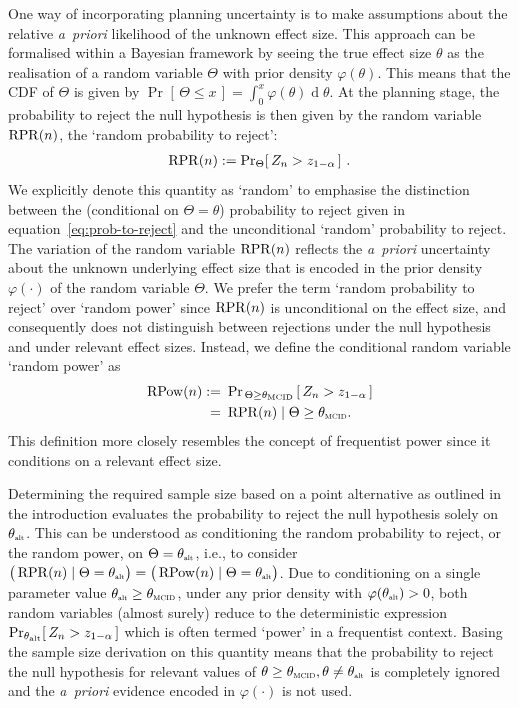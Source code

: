 \documentclass{article}
\renewcommand{\Pr}{\operatorname{Pr}}
\begin{document}
One way of incorporating planning uncertainty is to make assumptions about the relative \textit{a~priori} likelihood of the unknown effect size.
This approach can be formalised within a Bayesian framework by seeing the true effect size $\theta$ as the realisation of a random
variable $\Theta$ with prior density $\varphi(\theta)$.
This means that the CDF of
$\Theta$ is given by $\Pr_{}[\,\Theta\leq x\,] = \int_0^x \varphi(\theta) \operatorname{d} \theta$.
At the planning stage, the probability to reject the null hypothesis is then given by the random variable $\operatorname{RPR}(n)$, the `random probability to reject':
\begin{align}
    \rpr(n):=\Pr_{\Theta}[\,Z_n > \criticalvalue\,]\ .
\end{align}
We explicitly denote this quantity as `random' to emphasise the distinction between the
(conditional on $\Theta=\theta$) probability to reject given in equation~\eqref{eq:prob-to-reject} and the
unconditional `random' probability to reject.
The variation of the random variable $\operatorname{RPR}(n)$ reflects the \textit{a~priori} uncertainty about the unknown underlying effect size that is encoded in the prior density $\varphi(\cdot)$ of the random variable $\Theta$.
We prefer the term `random probability to reject' over `random power' since $\operatorname{RPR}(n)$ is unconditional on the effect size, and consequently does not distinguish between rejections under the null hypothesis and under relevant effect sizes.
\newcommand{\rpower}[1]{\operatorname{RPow}({ #1 })}
Instead, we define the conditional random variable `random power' as
\begin{align}
    \rpower{n}:= &\ \Pr_{\, \Theta\geq\mcid\, }[\,Z_n > \criticalvalue\,] \\ =& \ \rpr(n) \mid \Theta\geq\mcid.
\end{align}
This definition more closely resembles the concept of frequentist power since it conditions on a relevant effect size.

Determining the required sample size based on a point alternative as outlined in the introduction evaluates the probability to reject the null hypothesis solely on $\altv$.
This can be understood as conditioning the random probability to reject, or the random power, on $\Theta=\altv$, i.e., to consider $\big(\rpr(n) \mid \Theta = \altv \big) = \big(\rpower{n} \mid \Theta = \altv \big)$.
Due to conditioning on a single parameter value $\altv\geq\mcid$, under any prior density with $\varphi(\altv)>0$, both random variables (almost surely) reduce to the deterministic expression $\Pr_{\altv}[\,Z_n > \criticalvalue\,]$ which is often termed `power' in a frequentist context.
Basing the sample size derivation on this quantity means that the probability to reject the null hypothesis for relevant values of $\theta\geq\mcid, \theta\neq\altv$ is completely ignored and the \textit{a~priori} evidence encoded in $\varphi(\cdot)$ is not used.
\end{document}
